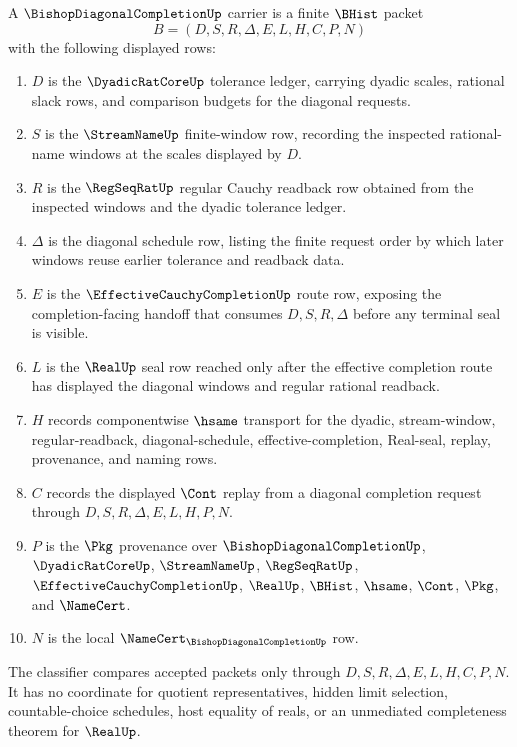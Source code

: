 \begin{definition}
\label{def:bishop-diagonal-completion-carrier}
A $\BishopDiagonalCompletionUp$ carrier is a finite $\BHist$ packet
$$
B=(D,S,R,\Delta,E,L,H,C,P,N)
$$
with the following displayed rows:
\begin{enumerate}
\item $D$ is the $\DyadicRatCoreUp$ tolerance ledger, carrying dyadic scales, rational slack rows, and comparison budgets for the diagonal requests.
\item $S$ is the $\StreamNameUp$ finite-window row, recording the inspected rational-name windows at the scales displayed by $D$.
\item $R$ is the $\RegSeqRatUp$ regular Cauchy readback row obtained from the inspected windows and the dyadic tolerance ledger.
\item $\Delta$ is the diagonal schedule row, listing the finite request order by which later windows reuse earlier tolerance and readback data.
\item $E$ is the $\EffectiveCauchyCompletionUp$ route row, exposing the completion-facing handoff that consumes $D,S,R,\Delta$ before any terminal seal is visible.
\item $L$ is the $\RealUp$ seal row reached only after the effective completion route has displayed the diagonal windows and regular rational readback.
\item $H$ records componentwise $\hsame$ transport for the dyadic, stream-window, regular-readback, diagonal-schedule, effective-completion, Real-seal, replay, provenance, and naming rows.
\item $C$ records the displayed $\Cont$ replay from a diagonal completion request through $D,S,R,\Delta,E,L,H,P,N$.
\item $P$ is the $\Pkg$ provenance over $\BishopDiagonalCompletionUp$, $\DyadicRatCoreUp$, $\StreamNameUp$, $\RegSeqRatUp$, $\EffectiveCauchyCompletionUp$, $\RealUp$, $\BHist$, $\hsame$, $\Cont$, $\Pkg$, and $\NameCert$.
\item $N$ is the local $\NameCert_{\BishopDiagonalCompletionUp}$ row.
\end{enumerate}
The classifier compares accepted packets only through $D,S,R,\Delta,E,L,H,C,P,N$. It has no coordinate for quotient representatives, hidden limit selection, countable-choice schedules, host equality of reals, or an unmediated completeness theorem for $\RealUp$.
\end{definition}

